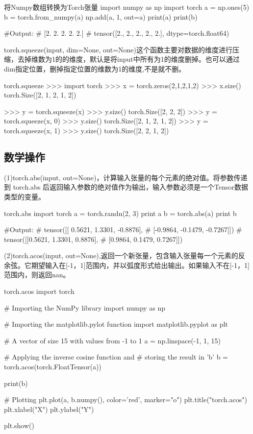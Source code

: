 \documentclass[openbib]{article}
\begin{document}
\begin{Python}{将Numpy数组转换为Torch张量}
	import numpy as np
	import torch
	a = np.ones(5)
	b = torch.from_numpy(a)
	np.add(a, 1, out=a)
	print(a)
	print(b)
	
	#Output:		
	#		[2. 2. 2. 2. 2.]
	#		tensor([2., 2., 2., 2., 2.], dtype=torch.float64)
\end{Python}

torch.squeeze(input, dim=None, out=None)这个函数主要对数据的维度进行压缩，去掉维数为1的的维度，默认是将input中所有为1的维度删掉。也可以通过dim指定位置，删掉指定位置的维数为1的维度,不是就不删。

\begin{Python}{torch.squeeze}
	>>> import torch	
	>>> x = torch.zeros(2,1,2,1,2)
	>>> x.size()
	torch.Size([2, 1, 2, 1, 2])
	
	>>> y = torch.squeeze(x)
	>>> y.size()
	torch.Size([2, 2, 2])
	>>> y = torch.squeeze(x, 0)
	>>> y.size()
	torch.Size([2, 1, 2, 1, 2])
	>>> y = torch.squeeze(x, 1)
	>>> y.size()
	torch.Size([2, 2, 1, 2])
	
\end{Python}

\subsection{数学操作}

(1)torch.abs(input, out=None)，计算输入张量的每个元素的绝对值。将参数传递到 torch.abs 后返回输入参数的绝对值作为输出，输入参数必须是一个Tensor数据类型的变量。

\begin{Python}{torch.abs}
	import torch
	a = torch.randn(2, 3)
	print a
	b = torch.abs(a)
	print b
	
	#Output:
	#		tensor([[ 0.5621,  1.3301, -0.8876],
	#				[-0.9864, -0.1479, -0.7267]])
	#		tensor([[0.5621, 1.3301, 0.8876],
	#				[0.9864, 0.1479, 0.7267]])
\end{Python}

(2)torch.acos(input, out=None),返回一个新张量，包含输入张量每一个元素的反余弦。它期望输入在[-1，1]范围内，并以弧度形式给出输出。如果输入不在[-1，1]范围内，则返回nan。
\begin{Python}{torch.acos}
	import torch
	
	# Importing the NumPy library
	import numpy as np
	
	# Importing the matplotlib.pylot function
	import matplotlib.pyplot as plt
	
	# A vector of size 15 with values from -1 to 1
	a = np.linspace(-1, 1, 15)
	
	# Applying the inverse cosine function and
	# storing the result in 'b'
	b = torch.acos(torch.FloatTensor(a))
	
	print(b)
	
	# Plotting
	plt.plot(a, b.numpy(), color='red', marker="o")
	plt.title("torch.acos")
	plt.xlabel("X")
	plt.ylabel("Y")
	
	plt.show()
\end{Python}
\end{document}
